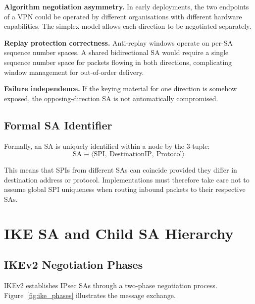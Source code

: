 \documentclass[sigconf,nonacm]{acmart}
\begin{document}
\textbf{Algorithm negotiation asymmetry.} In early deployments, the two endpoints of a
VPN could be operated by different organisations with different hardware capabilities.
The simplex model allows each direction to be negotiated separately.

\textbf{Replay protection correctness.} Anti-replay windows operate on per-SA sequence
number spaces. A shared bidirectional SA would require a single sequence number space
for packets flowing in both directions, complicating window management for out-of-order
delivery.

\textbf{Failure independence.} If the keying material for one direction is somehow
exposed, the opposing-direction SA is not automatically compromised.

\subsection{Formal SA Identifier}

Formally, an SA is uniquely identified within a node by the 3-tuple:
\[
  \mathrm{SA} \equiv \langle \mathrm{SPI},\ \mathrm{DestinationIP},\ \mathrm{Protocol} \rangle
\]

This means that SPIs from different SAs can coincide provided they differ in
destination address or protocol. Implementations must therefore take care not to
assume global SPI uniqueness when routing inbound packets to their respective SAs.

\section{IKE SA and Child SA Hierarchy}
\label{sec:hierarchy}

\subsection{IKEv2 Negotiation Phases}

IKEv2 establishes IPsec SAs through a two-phase negotiation process.
Figure~\ref{fig:ike_phases} illustrates the message exchange.
\end{document}

